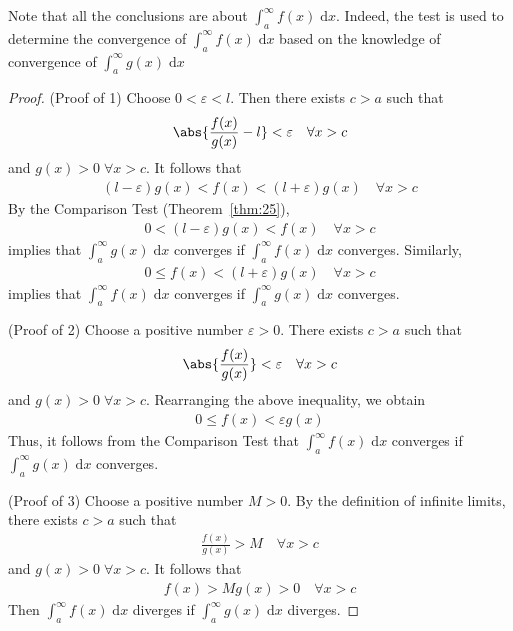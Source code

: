 \documentclass[thmcnt=section, 12pt]{elegantbook}
\begin{document}
\begin{remark}
    Note that all the conclusions are about $\int_a^\infty f(x) \; \mathrm{d}x$. Indeed, the test is used to determine the convergence of $\int_a^\infty f(x) \; \mathrm{d}x$ based on the knowledge of convergence of $\int_a^\infty g(x) \; \mathrm{d}x$
\end{remark}

\begin{proof}
    (Proof of 1) Choose $0 < \varepsilon < l$. Then there exists $c > a$ such that 
    \begin{align*}
        \abs{\frac{f(x)}{g(x)} - l} < \varepsilon
        \quad \forall x > c
    \end{align*}
    and $g(x) > 0 \; \forall x > c$. It follows that 
    \begin{align*}
        (l - \varepsilon) g(x) < f(x) < (l + \varepsilon) g(x)
        \quad \forall x > c
    \end{align*}
    By the Comparison Test (Theorem~\ref{thm:25}), 
    \begin{align*}
        0 < (l - \varepsilon) g(x) < f(x)
        \quad \forall x > c
    \end{align*}
    implies that $\int_a^\infty g(x) \; \mathrm{d}x$ converges if $\int_a^\infty f(x) \; \mathrm{d}x$ converges. Similarly,
    \begin{align*}
        0 \leq f(x) < (l + \varepsilon) g(x)
        \quad \forall x > c
    \end{align*}
    implies that $\int_a^\infty f(x) \; \mathrm{d}x$ converges if $\int_a^\infty g(x) \; \mathrm{d}x$ converges.

    \par (Proof of 2) Choose a positive number $\varepsilon > 0$. There exists $c > a$ such that 
    \begin{align*}
        \abs{\frac{f(x)}{g(x)}} < \varepsilon
        \quad \forall x > c
    \end{align*}
    and $g(x) > 0 \; \forall x > c$. Rearranging the above inequality, we obtain
    \begin{align*}
        0 \leq f(x) <  \varepsilon g(x)
    \end{align*}
    Thus, it follows from the Comparison Test that $\int_a^\infty f(x) \; \mathrm{d}x$ converges if $\int_a^\infty g(x) \; \mathrm{d}x$ converges. 

    \par (Proof of 3) Choose a positive number $M > 0$. By the definition of infinite limits, there exists $c > a$ such that 
    \begin{align*}
        \frac{f(x)}{g(x)} > M
        \quad \forall x > c
    \end{align*}
    and $g(x) > 0 \; \forall x > c$. It follows that 
    \begin{align*}
        f(x) > M g(x) > 0
        \quad \forall x > c
    \end{align*}
    Then $\int_a^\infty f(x) \; \mathrm{d}x$ diverges if $\int_a^\infty g(x) \; \mathrm{d}x$ diverges.
\end{proof}
\end{document}
